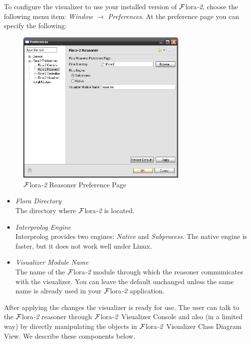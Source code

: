 \documentclass[a4paper,11pt]{article}
\newcommand{\FLORA}{{\mbox{\sc ${\cal F}${lora}\rm\emph{-2}}}\xspace}
\newcommand{\FVIZ}{{\mbox{\sc ${\cal F}${lora}\rm\emph{-2} {Visualizer}}}\xspace}
\begin{document}
To configure the visualizer to use your installed version of \FLORA,
choose the following menu item:
\emph{Window} $\rightarrow$ \emph{Preferences}.
At the preference page you can specify the following:

\begin{figure}[tbh]
	\centering
		\includegraphics[width=0.75\textwidth]{preferencepage_reasoner}
	\caption{\FLORA Reasoner Preference Page}
	\label{fig:preferencepage_reasoner}
\end{figure}

\begin{itemize}
\item \emph{Flora Directory}  \\
  The directory where \FLORA is located.

\item \emph{Interprolog Engine}  \\
  Interprolog provides two engines: \emph{Native} and \emph{Subprocess}.
  The native engine is faster, but it does not work well under Linux.

\item \emph{Visualizer Module Name}\\
  The name of the \FLORA module through which the reasoner communicates
  with the visualizer. You can leave the default unchanged unless the same
  name is already used in your \FLORA application.
\end{itemize}

After applying the changes the visualizer
is ready for use. The user can talk to the \FLORA reasoner through
\FVIZ Console and also (in a limited way) by directly manipulating the
objects in \FVIZ  Class Diagram View. We describe these components below.
\end{document}
